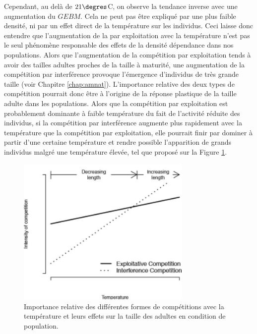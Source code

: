Cependant, au delà de $21\degres$C, on observe la tendance inverse avec une
augmentation du $GEBM$. Cela ne peut pas être expliqué par une plus faible
densité, ni par un effet direct de la température sur les individus.
Ceci laisse donc entendre que l'augmentation de la par exploitation avec la
température n'est pas le seul phénomène responsable des effets de la densité
dépendance dans nos populations. Alors que l'augmentation de la compétition par
exploitation tends à avoir des tailles adultes proches de la taille à maturité,
une augmentation de la compétition par interférence provoque l'émergence
d'individus de très grande taille (voir Chapitre \ref{chap:amnat}). L'importance
relative des deux types de compétition pourrait donc être à l'origine de la
réponse plastique de la taille adulte dans les populations. Alors que la
compétition par exploitation est probablement dominante à faible température du
fait de l'activité réduite des individus, si la compétition par interférence
augmente plus rapidement avec la température que la compétition par
exploitation, elle pourrait finir par dominer à partir d'une certaine
température et rendre possible l'apparition de grands individus malgré une
température élevée, tel que proposé sur la Figure \ref{fig:FIP7b}.

\begin{figure}[!ht]
\begin{center}
\includegraphics[width=0.75\textwidth]{1_CorpsDeThese/Resumes/Fig/FIP07b}
\caption[Importance relative
des différentes formes de compétitions]{Importance relative
des différentes formes de compétitions avec la température et leurs effets sur
la taille des adultes en condition de population.}
\label{fig:FIP7b}
\end{center}
\end{figure}

